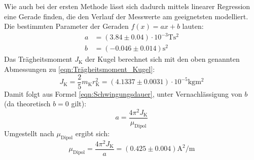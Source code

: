Wie auch bei der ersten Methode lässt sich dadurch mittels linearer Regression eine Gerade finden, die den Verlauf der Messwerte am geeignetsten modelliert.
Die bestimmten Parameter der Geraden $f(x) = ax + b$  lauten:
\begin{align*}
    a &= (3.84 \pm 0.04) \cdot 10^{-3} \unit{\tesla\second\squared} \\
    b &= (-0.046 \pm 0.014) \unit{\second\squared}
\end{align*}
Das Trägheitsmoment $J_\text{K}$ der Kugel berechnet sich mit den oben genannten Abmessungen zu \eqref{eqn:Trägheitsmoment_Kugel}:
\begin{equation*}
    J_\text{K} = \frac{2}{5} m_{\text{K}} r_{\text{K}}^2 = (4.1337 \pm 0.0031) \cdot 10^{-5} \unit{\kilogram\meter\squared}  
\end{equation*}
Damit folgt aus Formel \eqref{eqn:Schwingungsdauer}, unter Vernachlässigung von $b$ (da theoretisch $b = 0$ gilt):
\begin{equation*}
    a = \frac{4 \pi^2 J_{\text{K}}}{\mu_{\text{Dipol}}}
\end{equation*}
Umgestellt nach $\mu_{\text{Dipol}}$ ergibt sich:
\begin{equation}
    \label{eqn:mu2}
    \mu_{\text{Dipol}} = \frac{4 \pi^2 J_{\text{K}}}{a} = (0.425 \pm 0.004) \unit{\ampere\squared\per\metre}
\end{equation}
